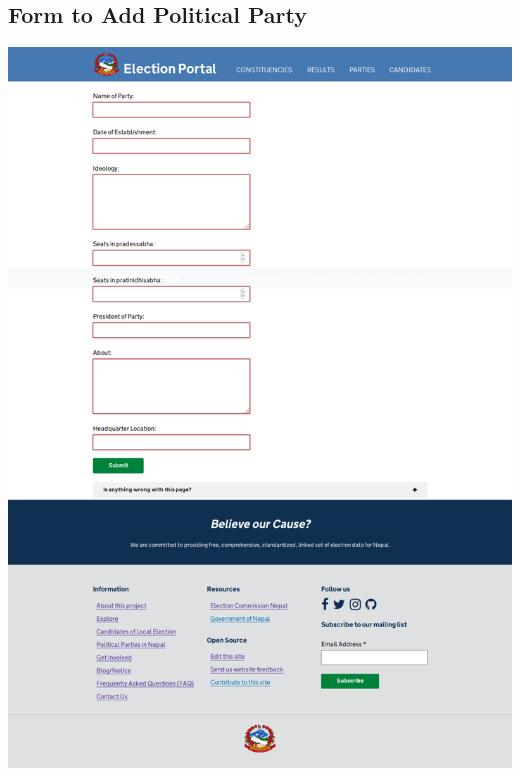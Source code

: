 \documentclass[12pt, a4paper, titlepage]{report}
\begin{document}
\subsection{Form to Add Political Party}
\begin{center}
\includegraphics[scale=0.25]{Form_To_Add_Political_Party.png}
\end{center}
\end{document}
